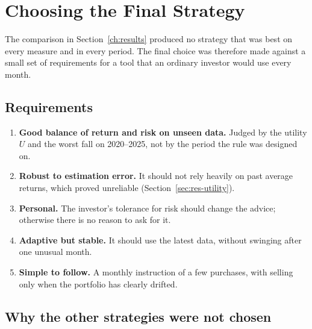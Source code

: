 \section{Choosing the Final Strategy}
\label{sec:choice}

The comparison in Section~\ref{ch:results} produced no strategy that was best on every measure and in
every period. The final choice was therefore made against a small set of requirements for a tool that
an ordinary investor would use every month.

\subsection{Requirements}

\begin{enumerate}
  \item \textbf{Good balance of return and risk on unseen data.} Judged by the utility $U$ and the
        worst fall on 2020--2025, not by the period the rule was designed on.
  \item \textbf{Robust to estimation error.} It should not rely heavily on past average returns,
        which proved unreliable (Section~\ref{sec:res-utility}).
  \item \textbf{Personal.} The investor's tolerance for risk should change the advice; otherwise
        there is no reason to ask for it.
  \item \textbf{Adaptive but stable.} It should use the latest data, without swinging after one
        unusual month.
  \item \textbf{Simple to follow.} A monthly instruction of a few purchases, with selling only when
        the portfolio has clearly drifted.
\end{enumerate}

\subsection{Why the other strategies were not chosen}

